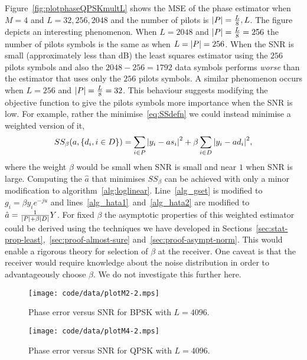 \documentclass[journal]{IEEEtran}
\begin{document}
Figure~\ref{fig:plotphaseQPSKmultL} shows the MSE of the phase estimator when $M=4$ and $L=32,256, 2048$ and the number of pilots is ${\left\vert P \right\vert}=\tfrac{L}{8},L$.  The figure depicts an interesting phenomenon.  When $L=2048$ and ${\left\vert P \right\vert} = \tfrac{L}{8} = 256$ the number of pilots symbols is the same as when $L={\left\vert P \right\vert} = 256$.  When the SNR is small (approximately less than \unit[0]{dB}) the least squares estimator using the $256$ pilots symbols and also the $2048-256=1792$ data symbols performs \emph{worse} than the estimator that uses only the $256$ pilots symbols.  A similar phenomenon occurs when $L=256$ and ${\left\vert P \right\vert} = \tfrac{L}{8} = 32$.  %
This behaviour suggests modifying the objective function to give the pilots symbols more importance when the SNR is low.  For example, rather the minimise~\eqref{eq:SSdefn} we could instead minimise a weighted version of it,
\[
SS_{\beta}(a, \{d_i, i \in D\}) = \sum_{i \in P} {\left\vert  y_i - a s_i  \right\vert}^2 + \beta \sum_{i \in D} {\left\vert  y_i - a d_i  \right\vert}^2,
\]
where the weight $\beta$ would be small when SNR is small and near $1$ when SNR is large.  Computing the $\hat{a}$ that minimises $SS_\beta$ can be achieved with only a minor modification to algorithm~\ref{alg:loglinear}.  Line~\ref{alg_gset} is modified to $g_i = \beta y_i e^{-j u}$ and lines~\ref{alg_hata1}~and~\ref{alg_hata2} are modified to $\hat{a} =  \frac{1}{{\left\vert P \right\vert} + \beta{\left\vert D \right\vert}} Y$.  For fixed $\beta$ the asymptotic properties of this weighted estimator could be derived using the techniques we have developed in Sections~\ref{sec:stat-prop-least},~\ref{sec:proof-almost-sure} and~\ref{sec:proof-asympt-norm}.  This would enable a rigorous theory for selection of $\beta$ at the receiver.  One caveat is that the receiver would require knowledge about the noise distribution in order to advantageously choose $\beta$.  We do not investigate this further here.

\begin{figure}[p]
	\centering
		\texttt{[image: code/data/plotM2-2.mps]}
		\caption{Phase error versus SNR for BPSK with $L=4096$.}
		\label{fig:plotphaseBPSK}
\end{figure}

\begin{figure}[p]
	\centering
		\texttt{[image: code/data/plotM4-2.mps]}
		\caption{Phase error versus SNR for QPSK with $L=4096$.}
		\label{fig:plotphaseQPSK}
\end{figure}
\end{document}
